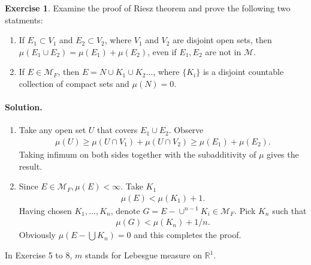 \documentclass[10pt,a4paper]{book}
\theoremstyle{definition}
\newtheorem{exercise}{Exercise}[chapter]
\begin{document}
	\begin{exercise}
		Examine the proof of Riesz theorem and prove the following two statments:
		\begin{enumerate}
			\item If $ E_1 \subset V_1 $ and $ E_2 \subset V_2 $, where $ V_1 $ and $ V_2 $ are disjoint open sets, then $ \mu(E_1 \cup E_2) = \mu(E_1) + \mu(E_2) $, even if $ E_1, E_2 $ are not in $ \mathcal{M} $.
			\item If $ E \in \mathcal{M}_F $, then $ E = N \cup K_1 \cup K_2 \dots $, where $ \{K_i\} $ is a disjoint countable collection of compact sets and $ \mu(N) = 0 $.
		\end{enumerate}

		\paragraph{Solution. }
		\begin{enumerate}
			\item Take any open set $ U $ that covers $ E_1 \cup E_2 $. Observe
			\begin{align*}
				\mu(U) \ge \mu(U \cap V_1) + \mu(U \cap V_2) \ge \mu(E_1) + \mu(E_2).
			\end{align*}
			Taking infimum on both sides together with the subadditivity of $ \mu $ gives the result.

			\item Since $ E \in \mathcal{M}_F, \mu(E) < \infty $. Take $ K_1 $
			\begin{align*}
				\mu(E) < \mu(K_1) + 1.
			\end{align*}
			Having chosen $ K_1, ..., K_n $, denote $ G = E - \cup ^{n-1} K_i \in \mathcal{M}_F$. Pick $ K_n $ such that
			\begin{align*}
				 \mu(G) < \mu(K_n) + 1/n .
			\end{align*}
		 	Obviously $ \mu(E - \bigcup K_n) = 0 $ and this completes the proof.


		\end{enumerate}
	\end{exercise}

	In Exercise 5 to 8, $ m $ stands for Lebesgue measure on $ \mathbb{R}^1 $.
\end{document}
